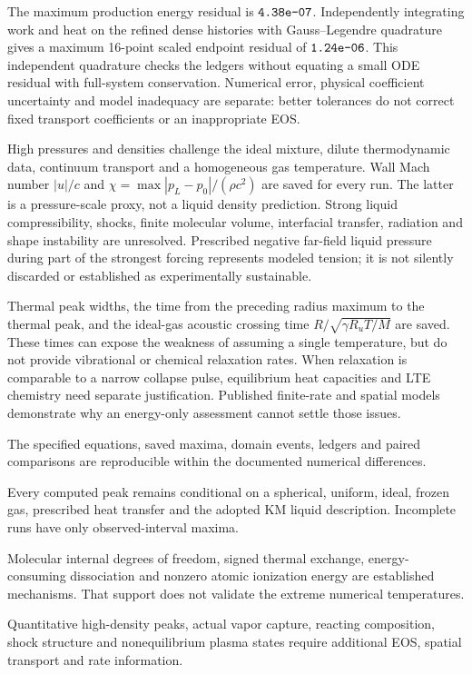 \documentclass[10pt,a4paper]{article}
\newcommand{\sci}[1]{\ensuremath{\texttt{#1}}}
\begin{document}
The maximum production energy residual is \sci{\MaximumResidual}. Independently integrating work and heat on the refined dense histories with Gauss--Legendre quadrature gives a maximum 16-point scaled endpoint residual of \sci{\MaximumQuadratureResidual}. This independent quadrature checks the ledgers without equating a small ODE residual with full-system conservation. Numerical error, physical coefficient uncertainty and model inadequacy are separate: better tolerances do not correct fixed transport coefficients or an inappropriate EOS.

High pressures and densities challenge the ideal mixture, dilute thermodynamic data, continuum transport and a homogeneous gas temperature. Wall Mach number $|u|/c$ and $\chi=\max|p_L-p_0|/(\rho c^2)$ are saved for every run. The latter is a pressure-scale proxy, not a liquid density prediction. Strong liquid compressibility, shocks, finite molecular volume, interfacial transfer, radiation and shape instability are unresolved. Prescribed negative far-field liquid pressure during part of the strongest forcing represents modeled tension; it is not silently discarded or established as experimentally sustainable.

Thermal peak widths, the time from the preceding radius maximum to the thermal peak, and the ideal-gas acoustic crossing time $R/\sqrt{\gamma R_uT/M}$ are saved. These times can expose the weakness of assuming a single temperature, but do not provide vibrational or chemical relaxation rates. When relaxation is comparable to a narrow collapse pulse, equilibrium heat capacities and LTE chemistry need separate justification. Published finite-rate and spatial models~\cite{yuan,hammer} demonstrate why an energy-only assessment cannot settle those issues.

\begin{description}\setlength\itemsep{2pt}
\item[Numerically reproducible.] The specified equations, saved maxima, domain events, ledgers and paired comparisons are reproducible within the documented numerical differences.
\item[Conditional model-based estimate.] Every computed peak remains conditional on a spherical, uniform, ideal, frozen gas, prescribed heat transfer and the adopted KM liquid description. Incomplete runs have only observed-interval maxima.
\item[Physically supported.] Molecular internal degrees of freedom, signed thermal exchange, energy-consuming dissociation and nonzero atomic ionization energy are established mechanisms. That support does not validate the extreme numerical temperatures.
\item[Requires a more complete physical model.] Quantitative high-density peaks, actual vapor capture, reacting composition, shock structure and nonequilibrium plasma states require additional EOS, spatial transport and rate information.
\end{description}
\end{document}
